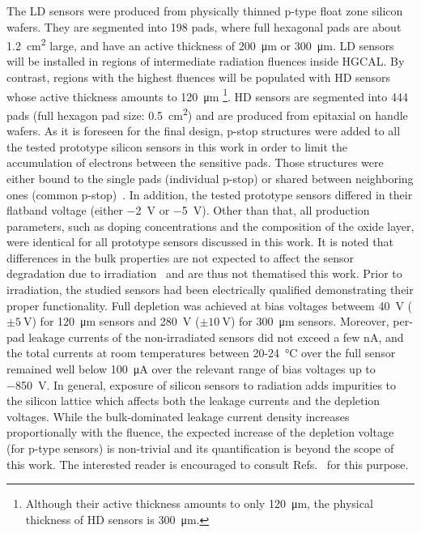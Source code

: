 The LD sensors were produced from physically thinned p-type float zone silicon wafers.
They are segmented into 198 pads, where full hexagonal pads are about \SI{1.2}{\centi\metre\squared} large, and have an active thickness of \SI{200}{\micro\meter} or \SI{300}{\micro\meter}.
LD sensors will be installed in regions of intermediate radiation fluences inside HGCAL.
By contrast, regions with the highest fluences will be populated with HD sensors whose active thickness amounts to \SI{120}{\micro\meter} \footnote{Although their active thickness amounts to only \SI{120}{\micro\meter}, the physical thickness of HD sensors is \SI{300}{\micro\meter}.}.\newline
HD sensors are segmented into 444 pads (full hexagon pad size: \SI{0.5}{\centi\metre\squared}) and are produced from epitaxial on handle wafers.
As it is foreseen for the final design, p-stop structures were added to all the tested prototype silicon sensors in this work in order to limit the accumulation of electrons between the sensitive pads.
Those structures were either bound to the single pads (individual p-stop) or shared between neighboring ones (common p-stop)~\cite{Brondolin_2020}.
In addition, the tested prototype sensors differed in their flatband voltage (either \SI{-2}{\volt} or \SI{-5}{\volt}).
Other than that, all production parameters, such as doping concentrations and the composition of the oxide layer, were identical for all prototype sensors discussed in this work.
It is noted that differences in the bulk properties are not expected to affect the sensor degradation due to irradiation~\cite{MOLL199987} and are thus not thematised this work.
\newline
Prior to irradiation, the studied sensors had been electrically qualified demonstrating their proper functionality.
Full depletion was achieved at bias voltages betweem \SI{40}{\volt} ($\pm\SI{5}{\volt}$) for \SI{120}{\micro\metre} sensors and \SI{280}{\volt} ($\pm\SI{10}{\volt}$) for \SI{300}{\micro\meter} sensors. 
Moreover, per-pad leakage currents of the non-irradiated sensors did not exceed a few nA, and the total currents at room temperatures between 20-\SI{24}{\celsius} over the full sensor remained well below \SI{100}{\micro\ampere} over the relevant range of bias voltages up to \SI{-850}{\volt}. \newline
In general, exposure of silicon sensors to radiation adds impurities to the silicon lattice which affects both the leakage currents and the depletion voltages. 
While the bulk-dominated leakage current density increases proportionally with the fluence, the expected increase of the depletion voltage (for p-type sensors) is non-trivial and its quantification is beyond the scope of this work.
The interested reader is encouraged to consult Refs.~\cite{moll:SiDamages,LINDSTROM200330} for this purpose.